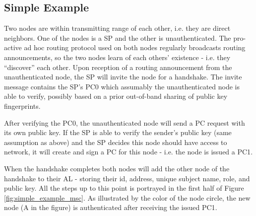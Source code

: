 \subsection{Simple Example}
Two nodes are within transmitting range of each other, i.e. they are direct
neighbors. One of the nodes is a \ac{SP} and the other is unauthenticated. The
pro-active ad hoc routing protocol used on both nodes regularly broadcasts
routing announcements, so the two nodes learn of each others' existence - i.e.
they ``discover'' each other. Upon reception of a routing announcement from the
unauthenticated node, the \ac{SP} will invite the node for a handshake. The
invite message contains the \ac{SP}'s \ac{PC0} which assumably the
unauthenticated node is able to verify, possibly based on a prior out-of-band
sharing of public key fingerprints.

After verifying the \ac{PC0}, the unauthenticated node will send a \ac{PC}
request with its own public key. If the \ac{SP} is able to verify the sender's
public key (same assumption as above) and the \ac{SP} decides this node should
have access to network, it will create and sign a \ac{PC} for this node - i.e.
the node is issued a \ac{PC1}.



When the handshake completes both nodes will add the other node of the handshake
to their \ac{AL} - storing their id, address, unique subject name, role, and
public key. All the steps up to this point is portrayed in the first half of
Figure \ref{fig:simple_example_msc}. As illustrated by the color of the node
circle, the new node (A in the figure) is authenticated after receiving the
issued \ac{PC1}.

